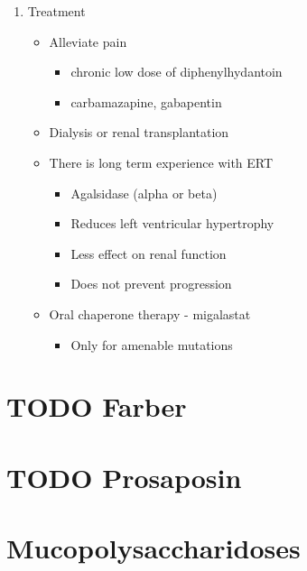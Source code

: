\documentclass{scrartcl}
\begin{document}
\begin{enumerate}
\item Treatment
\label{sec:org30d0e2c}
\begin{itemize}
\item Alleviate pain
\begin{itemize}
\item chronic low dose of diphenylhydantoin
\item carbamazapine, gabapentin
\end{itemize}
\item Dialysis or renal transplantation
\item There is long term experience with ERT
\begin{itemize}
\item Agalsidase (alpha or beta)
\item Reduces left ventricular hypertrophy
\item Less effect on renal function
\item Does not prevent progression
\end{itemize}
\item Oral chaperone therapy - migalastat
\begin{itemize}
\item Only for amenable mutations
\end{itemize}
\end{itemize}
\end{enumerate}

\section{{\bfseries\sffamily TODO} Farber}
\label{sec:orgc0ad830}

\section{{\bfseries\sffamily TODO} Prosaposin}
\label{sec:orgfde7c4b}

\section{Mucopolysaccharidoses}
\label{sec:org34c5002}
\end{document}

